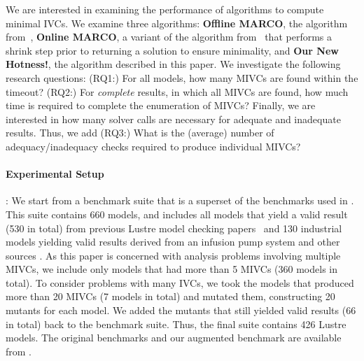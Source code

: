 We are interested in examining the performance of algorithms to compute minimal IVCs.  We examine three algorithms: \textbf{Offline MARCO}, the algorithm from~\cite{Ghass17AllIVCs}, \textbf{Online MARCO}, a variant of the algorithm from~\cite{Ghass17AllIVCs} that performs a shrink step prior to returning a solution to ensure minimality, and \textbf{Our New Hotness!}, the algorithm described in this paper.  We investigate the following research questions: (RQ1:) For all models, how many MIVCs are found within the timeout?  (RQ2:) For {\em complete} results, in which all MIVCs are found, how much time is required to complete the enumeration of MIVCs?  Finally, we are interested in how many solver calls are necessary for adequate and inadequate results.  Thus, we add (RQ3:) What is the (average) number of adequacy/inadequacy checks required to produce individual MIVCs?


\paragraph{Experimental Setup}:  We start from a benchmark suite that is a superset of the benchmarks used in \cite{Ghass17AllIVCs}. This suite contains 660 models, and includes all models that yield a valid result (530 in total) from previous Lustre model checking papers~\cite{Hagen08:FMCAD,piskac2016} and 130 industrial models yielding valid results derived from an infusion pump system \cite{hilt2013} and other sources \cite{piskac2016,NFM2015:backes}.
As this paper is concerned with analysis problems involving multiple MIVCs, we include only models that had more than 5 MIVCs (360 models in total).  To consider problems with many IVCs, we took the models that produced more than 20 MIVCs (7 models in total) and mutated them, constructing 20 mutants for each model.  We added the mutants that still yielded valid results (66 in total) back to the benchmark suite.
Thus, the final suite contains 426 Lustre models. The original benchmarks and our augmented benchmark are available from \cite{bench}.

